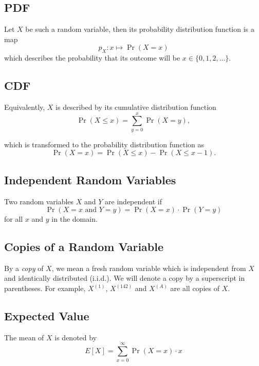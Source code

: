 \documentclass{masterthesis}
\begin{document}
\subsection*{PDF}\label{paragraph:pdf}
Let $X$ be such a random variable, then its probability distribution function is a map
\begin{equation}
    p_X : x \mapsto \Pr(X = x)
\end{equation} 
which describes the probability that its outcome will be $x \in \{0, 1, 2, \ldots \}$.

\subsection*{CDF}\label{paragraph:cdf}
Equivalently, $X$ is described by its cumulative distribution function
\begin{equation}
    \Pr(X \leq x) = \sum_{y=0}^{x} \Pr(X = y),
\end{equation}

which is transformed to the probability distribution function as 
\begin{equation}
    \Pr(X = x) = \Pr(X \leq x) - \Pr(X \leq x - 1).
\end{equation}

\subsection*{Independent Random Variables}\label{paragraph:independent_random_variables}
Two random variables $X$ and $Y$ are independent if 
\begin{equation}
    \Pr(X = x \text{ and } Y = y) = \Pr(X = x) \cdot \Pr(Y = y)
\end{equation}
for all $x$ and $y$ in the domain.

\subsection*{Copies of a Random Variable}\label{paragraph:copies_of_a_random_variable} By a \textit{copy} of $X$, we mean a fresh random variable which is independent from $X$ and identically distributed (i.i.d.).
We will denote a copy by a superscript in parentheses. For example, $X^{(1)}$, $X^{(142)}$ and $X^{(A)}$ are all copies of $X$.

\subsection*{Expected Value}
The mean of $X$ is denoted by 
\begin{equation}\label{eq:expectation}
    E[X] = \sum_{x=0}^{\infty} \Pr(X = x) \cdot x
\end{equation}
\end{document}
